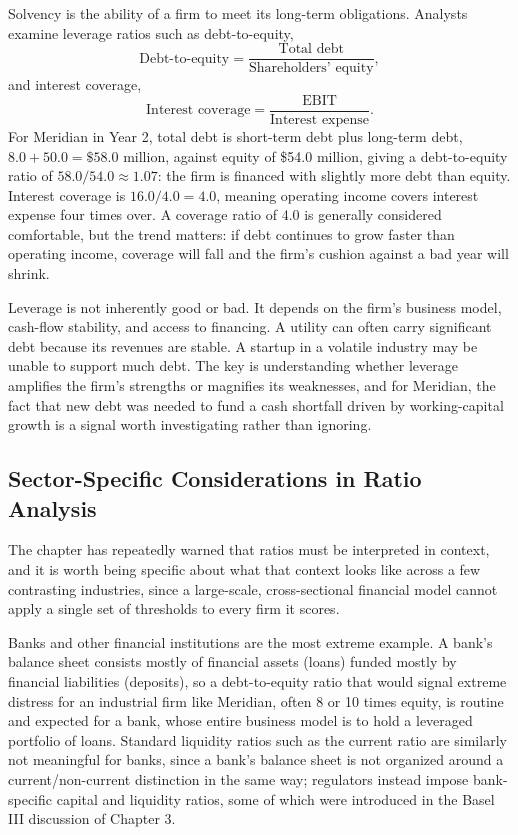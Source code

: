 \documentclass[../ai_in_finance]{subfiles}
\begin{document}
Solvency is the ability of a firm to meet its long-term obligations. Analysts examine leverage ratios such as debt-to-equity,
\begin{equation*}
\text{Debt-to-equity} = \frac{\text{Total debt}}{\text{Shareholders' equity}},
\end{equation*}
and interest coverage,
\begin{equation*}
\text{Interest coverage} = \frac{\text{EBIT}}{\text{Interest expense}}.
\end{equation*}
For Meridian in Year 2, total debt is short-term debt plus long-term debt, $8.0 + 50.0 = \$58.0$ million, against equity of \$54.0 million, giving a debt-to-equity ratio of $58.0/54.0 \approx 1.07$: the firm is financed with slightly more debt than equity. Interest coverage is $16.0/4.0 = 4.0$, meaning operating income covers interest expense four times over. A coverage ratio of 4.0 is generally considered comfortable, but the trend matters: if debt continues to grow faster than operating income, coverage will fall and the firm's cushion against a bad year will shrink.

Leverage is not inherently good or bad. It depends on the firm's business model, cash-flow stability, and access to financing. A utility can often carry significant debt because its revenues are stable. A startup in a volatile industry may be unable to support much debt. The key is understanding whether leverage amplifies the firm's strengths or magnifies its weaknesses, and for Meridian, the fact that new debt was needed to fund a cash shortfall driven by working-capital growth is a signal worth investigating rather than ignoring.

\subsection{Sector-Specific Considerations in Ratio Analysis}

The chapter has repeatedly warned that ratios must be interpreted in context, and it is worth being specific about what that context looks like across a few contrasting industries, since a large-scale, cross-sectional financial model cannot apply a single set of thresholds to every firm it scores.

Banks and other financial institutions are the most extreme example. A bank's balance sheet consists mostly of financial assets (loans) funded mostly by financial liabilities (deposits), so a debt-to-equity ratio that would signal extreme distress for an industrial firm like Meridian, often 8 or 10 times equity, is routine and expected for a bank, whose entire business model is to hold a leveraged portfolio of loans. Standard liquidity ratios such as the current ratio are similarly not meaningful for banks, since a bank's balance sheet is not organized around a current/non-current distinction in the same way; regulators instead impose bank-specific capital and liquidity ratios, some of which were introduced in the Basel III discussion of Chapter 3.
\end{document}
